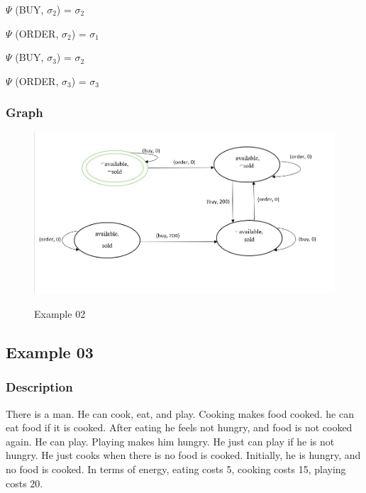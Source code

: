\documentclass[11pt]{article}
\begin{document}
	\(  \Psi  \)  (BUY, $ \sigma _{2}$) = $ \sigma _{2}$\par
	
	\(  \Psi  \)  (ORDER, $ \sigma _{2}$) = $ \sigma _{1}$\par
	
	\(  \Psi  \)  (BUY, $ \sigma _{3}$) = $ \sigma _{2}$\par
	
	\(  \Psi  \)  (ORDER, $ \sigma _{3}$) = $ \sigma _{3}$\par
	\subsubsection{Graph}\label{par:p402}
	\begin{figure}[H]
		\includegraphics[width=1\linewidth, height=0.4\textheight]{./media/image1.jpeg}
		\label{Figure:f02}
		\caption{Example 02}
	\end{figure}
	\subsection{Example 03}
	\subsubsection{Description}\label{par:p103}
	There is a man. He can cook, eat, and play. Cooking makes food cooked. he can eat food if it is cooked. After eating he feels not hungry, and food is not cooked again. He can play. Playing makes him hungry. He just can play if he is not hungry. He just cooks when there is no food is cooked. Initially, he is hungry, and no food is cooked. In terms of energy, eating costs 5, cooking costs 15, playing costs 20.\\
	\\
\end{document}
